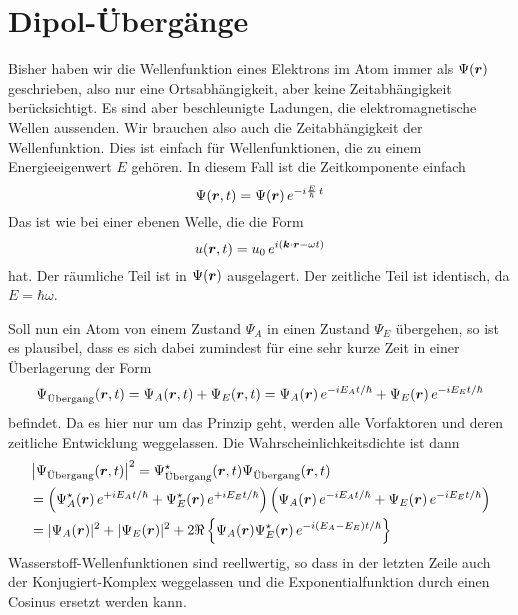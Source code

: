 \section{Dipol-Übergänge}

Bisher haben wir die Wellenfunktion eines Elektrons im Atom immer als $\Psi(\boldsymbol{r})$ geschrieben, also nur eine Ortsabhängigkeit, aber keine Zeitabhängigkeit berücksichtigt. Es sind aber beschleunigte Ladungen, die elektromagnetische Wellen aussenden. Wir brauchen also auch die Zeitabhängigkeit der Wellenfunktion. Dies ist einfach für Wellenfunktionen, die zu einem Energieeigenwert $E$ gehören. In diesem Fall ist die Zeitkomponente einfach 
\begin{equation}
    \Psi(\boldsymbol{r}, t) = \Psi(\boldsymbol{r}) \, e^{- i \frac{E}{\hbar} \, t}
\end{equation}
Das ist wie bei einer ebenen Welle, die die Form 
\begin{equation}
    u(\boldsymbol{r}, t) = u_0 \, e^{i ( \boldsymbol{k} \cdot \boldsymbol{r} - \omega t)}
\end{equation}
hat. Der räumliche Teil ist in $\Psi(\boldsymbol{r})$ ausgelagert. Der zeitliche Teil ist identisch, da $E = \hbar \omega$.

Soll nun ein Atom von einem Zustand $\Psi_A$ in einen Zustand $\Psi_E$ übergehen, so ist es plausibel, dass es sich dabei zumindest für eine sehr kurze Zeit in einer Überlagerung der Form 
\begin{equation}
    \Psi_\text{Übergang} (\boldsymbol{r}, t) = \Psi_A(\boldsymbol{r}, t) + \Psi_E(\boldsymbol{r}, t) = 
    \Psi_A(\boldsymbol{r}) \, e^{-i E_A t / \hbar} +  \Psi_E(\boldsymbol{r}) \, e^{-i E_E t / \hbar}
\end{equation}
befindet. Da es hier nur um das Prinzip geht, werden alle Vorfaktoren und deren zeitliche Entwicklung weggelassen. Die Wahrscheinlichkeitsdichte ist dann
\begin{align}
    & \left| \Psi_\text{Übergang} (\boldsymbol{r}, t)  \right|^2 =  \Psi_\text{Übergang}^\star (\boldsymbol{r}, t) \Psi_\text{Übergang} (\boldsymbol{r}, t)  \\
   & =  \left(  \Psi_A^\star(\boldsymbol{r}) \, e^{+i E_A t / \hbar} +  \Psi_E^\star(\boldsymbol{r}) \, e^{+i E_E t / \hbar} \right)
    \left(  \Psi_A(\boldsymbol{r}) \, e^{-i E_A t / \hbar} +  \Psi_E(\boldsymbol{r}) \, e^{-i E_E t / \hbar} \right) \\
    & = | \Psi_A(\boldsymbol{r})|^2 + | \Psi_E(\boldsymbol{r})|^2  + 2 \Re \left\{ \Psi_A(\boldsymbol{r})\Psi_E^\star(\boldsymbol{r})  \, e^{-i (E_A - E_E) t / \hbar}  \right\} 
\end{align}
Wasserstoff-Wellenfunktionen sind reellwertig, so dass in der letzten Zeile auch der Konjugiert-Komplex weggelassen und die Exponentialfunktion durch einen Cosinus ersetzt werden kann.

